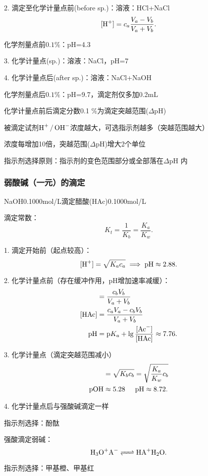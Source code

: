 2. 滴定至化学计量点前(before sp.)：溶液：HCl+NaCl
\[
    [\ce{H+}]=c_a \frac{V_a-V_b}{V_a+V_b}
.\] 
\begin{notation}
    化学剂量点前$0.1\%$：pH=4.3
\end{notation}
3. 化学计量点(sp.)：溶液：NaCl，pH=7

4. 化学计量点后(after sp.)：溶液：NaCl+NaOH
\begin{notation}
    化学剂量点后$0.1\%$：pH=9.7，滴定剂仅多加0.2mL
\end{notation}
\begin{notation}
    化学计量点前后滴定分数0.1 \%为滴定突越范围($\Delta \text{pH}$)
\end{notation}
\begin{notation}
    被滴定试剂$\ce{H+ / OH-}$浓度越大，可选指示剂越多（突越范围越大）

    浓度每增加10倍，突越范围($\Delta \text{pH}$)增大2个单位
\end{notation}
\begin{notation}
    指示剂选择原则：指示剂的变色范围部分或全部落在$\Delta \text{pH}$ 内
\end{notation}
\subsubsection{弱酸碱（一元）的滴定}%
\label{subsub:弱酸碱-一元-的滴定}
\begin{eg}
    NaOH0.1000mol/L滴定醋酸(HAc)0.1000mol/L
\end{eg}
滴定常数： \[
    K_t=\frac{1}{K_b}=\frac{K_a}{K_w}
.\]

1. 滴定开始前（起点较高）：\[
    [\ce{H+}]=\sqrt{K_ac_a}\implies\text{pH}\approx 2.88 
.\] 

2. 化学计量点前（存在缓冲作用，pH增加速率减缓）：
\begin{align*}
    [\ce{Ac-}]&= \frac{c_bV_b}{V_a+V_b} \\
    [\text{HAc}]&= \frac{c_aV_a-c_bV_b}{V_a+V_b}\\
    \text{pH}&=\text{p}K_a+\lg \frac{[\ce{Ac-}]}{[\text{HAc}]}\approx 7.76
.\end{align*}

3. 化学计量点（滴定突越范围减小）
\begin{align*}
    [\ce{OH-}]&=\sqrt{K_bc_b} =\sqrt{\frac{K_a}{K_w}c_b} \\
    \text{pOH}&\approx 5.28 \hspace{0.5cm} \text{pH}\approx 8.72
.\end{align*}

4. 化学计量点后与强酸碱滴定一样

指示剂选择：酚酞
\begin{notation}
    强酸滴定弱碱：\[
        \ce{H_3O+A- <=> HA+H_2O}
    .\] 

    指示剂选择：甲基橙、甲基红
\end{notation}

